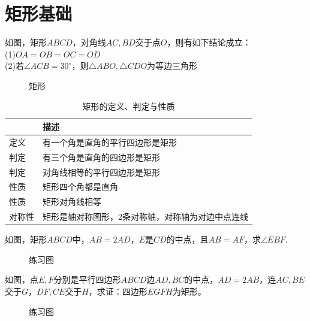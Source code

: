 \section{矩形基础}
\begin{theorem}
    如图，矩形$ABCD$，对角线$AC,BD$交于点$O$，则有如下结论成立：\\
    (1)$OA=OB=OC=OD$ \\
    (2)若$\angle ACB=30^\circ$，则$\triangle ABO,\triangle CDO$为等边三角形 \\
\end{theorem}
\begin{figure}[H]
    \centering
    \resizebox{4cm}{!}{}
    \caption{矩形}
\end{figure}
\begin{table}[H]
    \centering
    \caption{矩形的定义、判定与性质}
    \begin{tabular}{|l|l|}
        \hline
            & 描述                        \\
        \hline
        定义  & 有一个角是直角的平行四边形是矩形          \\
        \hline
        判定  & 有三个角是直角的四边形是矩形            \\
        \hline
        判定  & 对角线相等的平行四边形是矩形            \\
        \hline
        性质  & 矩形四个角都是直角                 \\
        \hline
        性质  & 矩形对角线相等                   \\
        \hline
        对称性 & 矩形是轴对称图形，2条对称轴，对称轴为对边中点连线 \\
        \hline
    \end{tabular}
\end{table}
\begin{problem}
如图，矩形$ABCD$中，$AB=2AD$，$E$是$CD$的中点，且$AB=AF$，求$\angle EBF$.
\end{problem}
\begin{figure}[H]
    \centering
    \resizebox{4cm}{!}{}
    \caption{练习图}
\end{figure}
\begin{problem}
如图，点$E,F$分别是平行四边形$ABCD$边$AD,BC$的中点，$AD=2AB$，连$AC,BE$交于$G$，$DF,CE$交于$H$，求证：四边形$EGFH$为矩形。
\end{problem}
\begin{figure}[H]
    \centering
    \resizebox{4cm}{!}{}
    \caption{练习图}
\end{figure}
